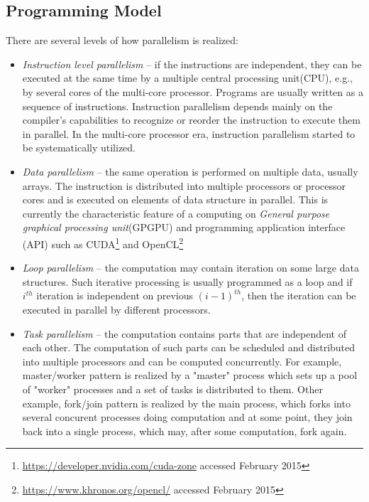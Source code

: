 \subsection{Programming Model}
\label{sec:parallelprogramming}
There are several levels of how parallelism is realized:
\begin{itemize}
\item{\emph{Instruction level parallelism} -- if the instructions are independent, they can be executed at the same time by a multiple central processing unit(CPU), e.g., by several cores of the multi-core processor. Programs are usually written as a sequence of instructions. Instruction parallelism depends mainly on the compiler's capabilities to recognize or reorder the instruction to execute them in parallel. In the multi-core processor era, instruction parallelism started to be systematically utilized.}
\item{\emph{Data parallelism} -- the same operation is performed on multiple data, usually arrays. The instruction is distributed into multiple processors or processor cores and is executed on elements of data structure in parallel. This is currently the characteristic feature of a computing on \emph{General purpose graphical processing unit}(GPGPU) and programming application interface (API) such as CUDA\footnote{\url{https://developer.nvidia.com/cuda-zone} accessed February 2015} and OpenCL\footnote{\url{https://www.khronos.org/opencl/} accessed February 2015}}
\item{\emph{Loop parallelism} -- the computation may contain iteration on some large data structures. Such iterative processing is usually programmed as a loop and if $i^{th}$ iteration is independent on previous $(i-1)^{th}$, then the iteration can be executed in parallel by different processors.}
\item{\emph{Task parallelism} -- the computation contains parts that are independent of each other. The computation of such parts can be scheduled and distributed into multiple processors and can be computed concurrently. For example, master/worker pattern is realized by a "master" process which sets up a pool of "worker" processes and a set of tasks is distributed to them. Other example, fork/join pattern is realized by the main process, which forks into several concurent processes doing computation and at some point, they join back into a single process, which may, after some computation, fork again.}
\end{itemize}

